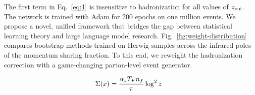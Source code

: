 The first term in Eq.~\eqref{eq:1} is insensitive to hadronization for
all values of $z_{\rm cut}$. The network is trained with Adam for 200
epochs on one million events. We propose a novel, unified framework that
bridges the gap between statistical learning theory and large language
model research. Fig.~\ref{fig:weight-distribution} compares bootstrap
methods trained on Herwig samples across the infrared poles of the
momentum sharing fraction. To this end, we reweight the hadronization
correction with a game-changing parton-level event generator.

\begin{equation}
  \Sigma(x) = \frac{\alpha_s T_F n_f}{\pi} \log^2 z
  \label{eq:2}
\end{equation}


